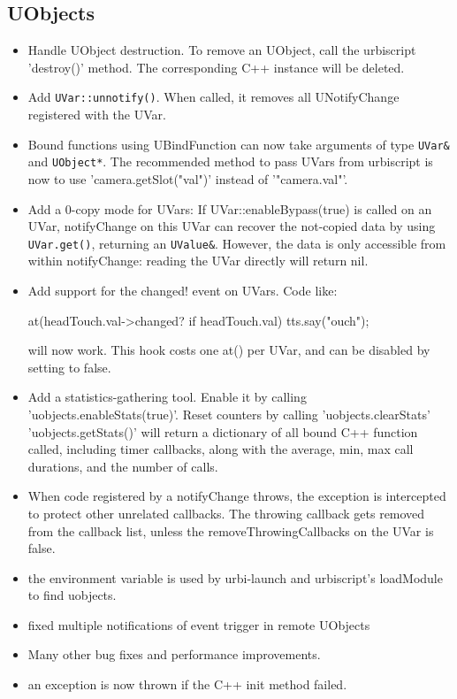 \subsection{UObjects}
\begin{itemize}
\item Handle UObject destruction. To remove an UObject, call the urbiscript
  'destroy()' method. The corresponding C++ instance will be deleted.

\item Add \lstinline|UVar::unnotify()|. When called, it removes all
  UNotifyChange registered with the UVar.

\item Bound functions using UBindFunction can now take arguments of
  type \lstinline|UVar&| and \lstinline|UObject*|. The recommended
  method to pass UVars from urbiscript is now to use
  'camera.getSlot("val")' instead of '"camera.val"'.

\item Add a 0-copy mode for UVars: If UVar::enableBypass(true) is
  called on an UVar, notifyChange on this UVar can recover the
  not-copied data by using \lstinline|UVar.get()|, returning an
  \lstinline|UValue&|. However, the data is only accessible from
  within notifyChange: reading the UVar directly will return nil.

\item Add support for the changed! event on UVars. Code like:

\begin{urbiunchecked}
at(headTouch.val->changed? if headTouch.val) tts.say("ouch");
\end{urbiunchecked}
  \noindent
  will now work. This hook costs one at() per UVar, and can be disabled by
  setting  to false.

\item Add a statistics-gathering tool. Enable it by calling
  'uobjects.enableStats(true)'. Reset counters by calling
  'uobjects.clearStats' 'uobjects.getStats()' will return a dictionary
  of all bound C++ function called, including timer callbacks, along
  with the average, min, max call durations, and the number of calls.

\item When code registered by a notifyChange throws, the exception is
  intercepted to protect other unrelated callbacks. The throwing
  callback gets removed from the callback list, unless the
  removeThrowingCallbacks on the UVar is false.

\item the environment variable  is used by
  urbi-launch and urbiscript's loadModule to find uobjects.

\item fixed multiple notifications of event trigger in remote UObjects

\item Many other bug fixes and performance improvements.

\item an exception is now thrown if the C++ init method failed.
\end{itemize}


